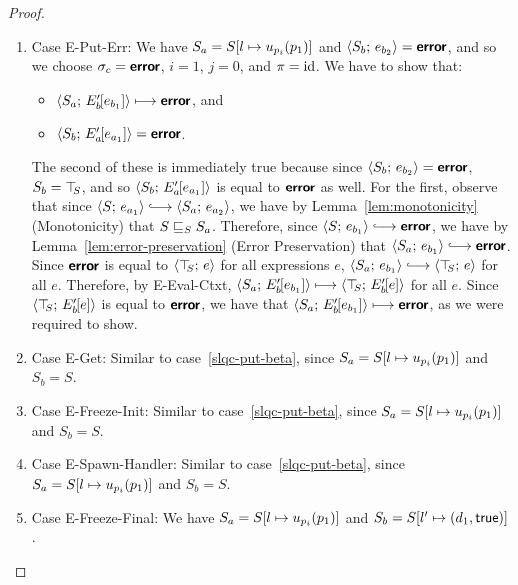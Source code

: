 \begin{proof}
\begin{enumerate}
\begin{enumerate}
\begin{itemize}
      \end{itemize}

    \item \label{slqc-put-put-err}Case {\sc E-Put-Err}: We have $S_a =
      S[l \mapsto u_{p_i}(p_1)]$ and $\langle S_b;\, e_{b_2} \rangle =
      \textbf{\textsf{error}}$, and so we choose $\sigma_c = \textbf{\textsf{error}}$, $i = 1$, $j = 0$,
      and $\pi = \mathrm{id}$.  We have to show that:
      \begin{itemize}
      \item $\langle S_a;\, E'_b\hspace{-1mm}\left[e_{b_1}\right] \rangle \longmapsto
        \textbf{\textsf{error}}$, and
      \item $\langle S_b;\, E'_a\hspace{-1mm}\left[e_{a_1}\right] \rangle = \textbf{\textsf{error}}$.
      \end{itemize}

      The second of these is immediately true because since
      $\langle S_b;\, e_{b_2} \rangle = \textbf{\textsf{error}}$, $S_b = \top\hspace{-0.85mm}_{S}$, and so
      $\langle S_b;\, E'_a\hspace{-1mm}\left[e_{a_1}\right] \rangle$ is equal to $\textbf{\textsf{error}}$ as
      well.  For the first, observe that since $\config{S}{e_{a_1}}
      \parstepsto \config{S_a}{e_{a_2}}$, we have by
      Lemma~\ref{lem:monotonicity} (Monotonicity) that
      $S \sqsubseteq_S S_a$.  Therefore, since $\config{S}{e_{b_1}}
      \parstepsto \error$, we have by
      Lemma~\ref{lem:error-preservation} (Error Preservation) that
      $\config{S_a}{e_{b_1}} \parstepsto \error$.  Since $\textbf{\textsf{error}}$ is
      equal to $\langle \top\hspace{-0.85mm}_{S};\, e \rangle$ for all expressions $e$,
      $\config{S_a}{e_{b_1}} \parstepsto \config{\topS}{e}$ for all
      $e$.  Therefore, by {\sc E-Eval-Ctxt},
      $\langle S_a;\, E'_b\hspace{-1mm}\left[e_{b_1}\right] \rangle \longmapsto
      \langle \top\hspace{-0.85mm}_{S};\, E'_b\hspace{-1mm}\left[e\right] \rangle$ for all $e$.  Since
      $\langle \top\hspace{-0.85mm}_{S};\, E'_b\hspace{-1mm}\left[e\right] \rangle$ is equal to $\textbf{\textsf{error}}$, we
      have that $\langle S_a;\, E'_b\hspace{-1mm}\left[e_{b_1}\right] \rangle \longmapsto
      \textbf{\textsf{error}}$, as we were required to show.

    \item \label{slqc-put-get}Case {\sc E-Get}: Similar to
      case~\ref{slqc-put-beta}, since $S_a =
      S[l \mapsto u_{p_i}(p_1)]$ and $S_b = S$.
    \item \label{slqc-put-freeze-init}Case {\sc E-Freeze-Init}:
      Similar to case~\ref{slqc-put-beta}, since $S_a =
      S[l \mapsto u_{p_i}(p_1)]$ and $S_b = S$.
    \item \label{slqc-put-spawn-handler}Case {\sc E-Spawn-Handler}:
      Similar to case~\ref{slqc-put-beta}, since $S_a =
      S[l \mapsto u_{p_i}(p_1)]$ and $S_b = S$.
    \item \label{slqc-put-freeze-final}Case {\sc E-Freeze-Final}: We
      have $S_a = S[l \mapsto u_{p_i}(p_1)]$ and $S_b =
      S[l' \mapsto (d_1, \textsf{true})]$.


\end{enumerate}
\end{enumerate}
\end{proof}

